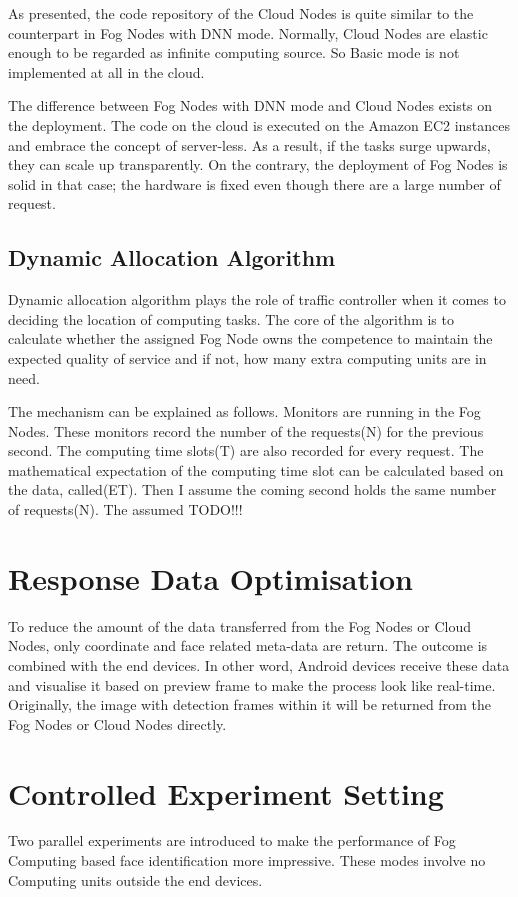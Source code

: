 As presented, the code repository of the Cloud Nodes is quite similar to the counterpart in Fog Nodes with DNN mode. Normally, Cloud Nodes are elastic enough to be regarded as infinite computing source. So Basic mode is not implemented at all in the cloud.

The difference between Fog Nodes with DNN mode and Cloud Nodes exists on the deployment. The code on the cloud is executed on the Amazon EC2 instances and embrace the concept of server-less. As a result, if the tasks surge upwards, they can scale up transparently. On the contrary, the deployment of Fog Nodes is solid in that case; the hardware is fixed even though there are a large number of request.

\subsection{Dynamic Allocation Algorithm}
Dynamic allocation algorithm plays the role of traffic controller when it comes to deciding the location of computing tasks. The core of the algorithm is to calculate whether the assigned Fog Node owns the competence to maintain the expected quality of service and if not, how many extra computing units are in need.

The mechanism can be explained as follows. Monitors are running in the Fog Nodes. These monitors record the number of the requests(N) for the previous second. The computing time slots(T) are also recorded for every request. The mathematical expectation of the computing time slot can be calculated based on the data, called(ET). Then I assume the coming second holds the same number of requests(N). The assumed {TODO!!!}

\section{Response Data Optimisation}
To reduce the amount of the data transferred from the Fog Nodes or Cloud Nodes, only coordinate and face related meta-data are return. The outcome is combined with the end devices. In other word, Android devices receive these data and visualise it based on preview frame to make the process look like real-time. Originally, the image with detection frames within it will be returned from the Fog Nodes or Cloud Nodes directly. 

\section{Controlled Experiment Setting}
Two parallel experiments are introduced to make the performance of Fog Computing based face identification more impressive. These modes involve no Computing units outside the end devices.

